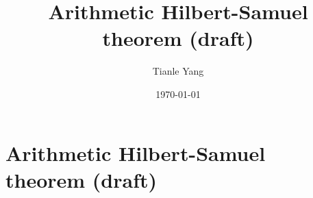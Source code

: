 \documentclass{noteformyself}
\title{Arithmetic Hilbert-Samuel theorem (draft)}
\author{Tianle Yang}
\date{\today}
\begin{document}
    \maketitle

    \section{Arithmetic Hilbert-Samuel theorem (draft)}



\end{document}
